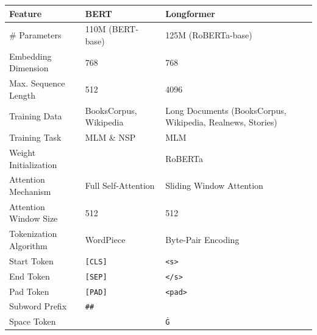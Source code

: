 \begin{table}[htb!]
    \centering
    \begin{tabular}{l p{5cm} p{5cm}}
        \toprule
        \textbf{Feature}       & \textbf{BERT}          & \textbf{Longformer}                                        \\
        \midrule
        \# Parameters          & 110M (BERT-base)       & 125M (RoBERTa-base)                                        \\
        Embedding Dimension    & 768                    & 768                                                        \\
        Max. Sequence Length   & 512                    & 4096                                                       \\
        Training Data          & BooksCorpus, Wikipedia & Long Documents (BooksCorpus, Wikipedia, Realnews, Stories) \\
        Training Task          & MLM \& NSP             & MLM                                                        \\
        Weight Initialization  &                        & RoBERTa                                                    \\
        Attention Mechanism    & Full Self-Attention    & Sliding Window Attention                                   \\
        Attention Window Size  & 512                    & 512                                                        \\
        Tokenization Algorithm & WordPiece              & Byte-Pair Encoding                                         \\
        Start Token            & \texttt{[CLS]}         & \texttt{<s>}                                               \\
        End Token              & \texttt{[SEP]}         & \texttt{</s>}                                              \\
        Pad Token              & \texttt{[PAD]}         & \texttt{<pad>}                                             \\
        Subword Prefix         & \texttt{\#\#}          &                                                            \\
        Space Token            &                        & \texttt{Ġ}                                                 \\
        \bottomrule

\end{tabular}
\end{table}

